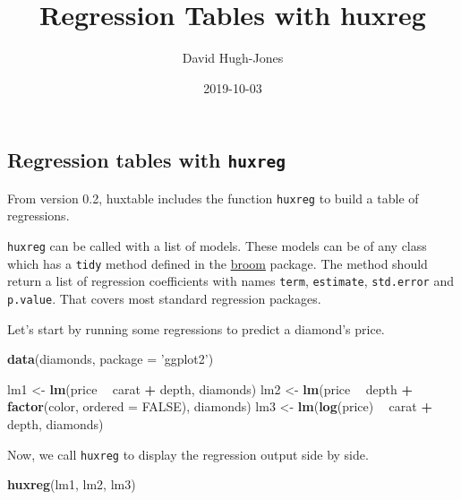\documentclass[]{article}
\title{Regression Tables with huxreg}
\author{David Hugh-Jones}
\date{2019-10-03}
\newenvironment{Shaded}{\begin{snugshade}}{\end{snugshade}}
\newcommand{\DataTypeTok}[1]{\textcolor[rgb]{0.13,0.29,0.53}{#1}}
\newcommand{\KeywordTok}[1]{\textcolor[rgb]{0.13,0.29,0.53}{\textbf{#1}}}
\newcommand{\NormalTok}[1]{#1}
\newcommand{\OperatorTok}[1]{\textcolor[rgb]{0.81,0.36,0.00}{\textbf{#1}}}
\newcommand{\OtherTok}[1]{\textcolor[rgb]{0.56,0.35,0.01}{#1}}
\newcommand{\StringTok}[1]{\textcolor[rgb]{0.31,0.60,0.02}{#1}}
\begin{document}
\maketitle

\hypertarget{regression-tables-with-huxreg}{%
\subsection{\texorpdfstring{Regression tables with
\texttt{huxreg}}{Regression tables with huxreg}}\label{regression-tables-with-huxreg}}

From version 0.2, huxtable includes the function \texttt{huxreg} to
build a table of regressions.

\texttt{huxreg} can be called with a list of models. These models can be
of any class which has a \texttt{tidy} method defined in the
\href{https://cran.r-project.org/?package=broom}{broom} package. The
method should return a list of regression coefficients with names
\texttt{term}, \texttt{estimate}, \texttt{std.error} and
\texttt{p.value}. That covers most standard regression packages.

Let's start by running some regressions to predict a diamond's price.

\begin{Shaded}
\begin{Highlighting}[]
\KeywordTok{data}\NormalTok{(diamonds, }\DataTypeTok{package =} \StringTok{'ggplot2'}\NormalTok{)}

\NormalTok{lm1 <-}\StringTok{ }\KeywordTok{lm}\NormalTok{(price }\OperatorTok{~}\StringTok{ }\NormalTok{carat }\OperatorTok{+}\StringTok{ }\NormalTok{depth, diamonds)}
\NormalTok{lm2 <-}\StringTok{ }\KeywordTok{lm}\NormalTok{(price }\OperatorTok{~}\StringTok{ }\NormalTok{depth }\OperatorTok{+}\StringTok{ }\KeywordTok{factor}\NormalTok{(color, }\DataTypeTok{ordered =} \OtherTok{FALSE}\NormalTok{), diamonds)}
\NormalTok{lm3 <-}\StringTok{ }\KeywordTok{lm}\NormalTok{(}\KeywordTok{log}\NormalTok{(price) }\OperatorTok{~}\StringTok{ }\NormalTok{carat }\OperatorTok{+}\StringTok{ }\NormalTok{depth, diamonds)}
\end{Highlighting}
\end{Shaded}

\FloatBarrier

Now, we call \texttt{huxreg} to display the regression output side by
side.

\begin{Shaded}
\begin{Highlighting}[]
\KeywordTok{huxreg}\NormalTok{(lm1, lm2, lm3)}
\end{Highlighting}
\end{Shaded}
\end{document}
